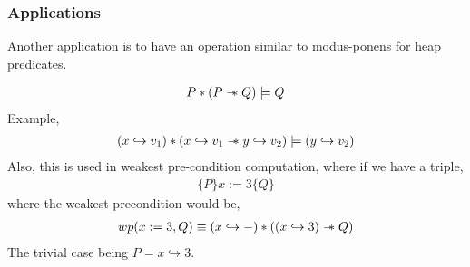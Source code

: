 \documentclass{beamer}
\newcommand\sepimp{\mathrel{-\mkern-6mu*}}
\begin{document}
\begin{frame}
\frametitle{Applications}
Another application is to have an operation similar to modus-ponens for heap predicates.

\begin{align*}
    P * (P \sepimp Q) \models Q
\end{align*}
Example,
\begin{align*}
    (x \hookrightarrow v_1) * (x \hookrightarrow v_1 \sepimp y \hookrightarrow v_2) \models (y \hookrightarrow v_2)
\end{align*}
Also, this is used in weakest pre-condition computation, where if we have a triple,
    \begin{align*}
    \{P\}x := 3\{Q\}
    \end{align*}
where the weakest precondition would be,
    \begin{align*}
        wp(x := 3, Q) \equiv (x \hookrightarrow -) * ((x \hookrightarrow 3) \sepimp Q)
    \end{align*}
The trivial case being $P = x \hookrightarrow 3$.
\end{frame}
\end{document}
